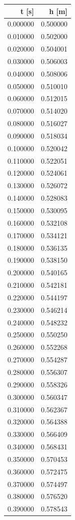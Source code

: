 \begin{tabular}{rr}
\toprule
t [s] & h [m] \\
\midrule
0.000000 & 0.500000 \\
0.010000 & 0.502000 \\
0.020000 & 0.504001 \\
0.030000 & 0.506003 \\
0.040000 & 0.508006 \\
0.050000 & 0.510010 \\
0.060000 & 0.512015 \\
0.070000 & 0.514020 \\
0.080000 & 0.516027 \\
0.090000 & 0.518034 \\
0.100000 & 0.520042 \\
0.110000 & 0.522051 \\
0.120000 & 0.524061 \\
0.130000 & 0.526072 \\
0.140000 & 0.528083 \\
0.150000 & 0.530095 \\
0.160000 & 0.532108 \\
0.170000 & 0.534121 \\
0.180000 & 0.536135 \\
0.190000 & 0.538150 \\
0.200000 & 0.540165 \\
0.210000 & 0.542181 \\
0.220000 & 0.544197 \\
0.230000 & 0.546214 \\
0.240000 & 0.548232 \\
0.250000 & 0.550250 \\
0.260000 & 0.552268 \\
0.270000 & 0.554287 \\
0.280000 & 0.556307 \\
0.290000 & 0.558326 \\
0.300000 & 0.560347 \\
0.310000 & 0.562367 \\
0.320000 & 0.564388 \\
0.330000 & 0.566409 \\
0.340000 & 0.568431 \\
0.350000 & 0.570453 \\
0.360000 & 0.572475 \\
0.370000 & 0.574497 \\
0.380000 & 0.576520 \\
0.390000 & 0.578543 \\

\end{tabular}
